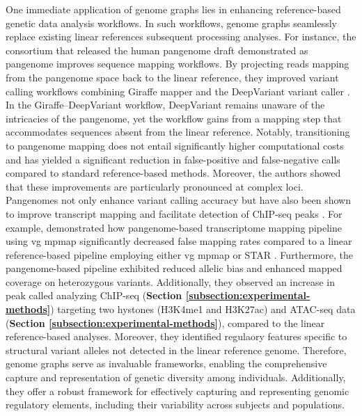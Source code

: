 \documentclass[a4paper, titlepage, openright]{book}
\begin{document}
One immediate application of genome graphs lies in enhancing reference-based genetic data analysis workflows. In such workflows, genome graphs seamlessly replace existing linear references subsequent processing analyses. For instance, the consortium that released the human pangenome draft demonstrated as pangenome improves sequence mapping workflows. By projecting reads mapping from the pangenome space back to the linear reference, they improved variant calling workflows combining Giraffe mapper \citep{siren2021pangenomics} and the DeepVariant variant caller \citep{poplin2018universal}. In the Giraffe–DeepVariant workflow, DeepVariant remains unaware of the intricacies of the pangenome, yet the workflow gains from a mapping step that accommodates sequences absent from the linear reference. Notably, transitioning to pangenome mapping does not entail significantly higher computational costs and has yielded a significant reduction in false-positive and false-negative calls compared to standard reference-based methods. Moreover, the authors showed that these improvements are particularly pronounced at complex loci. Pangenomes not only enhance variant calling accuracy but have also been shown to improve transcript mapping \citep{sibbesen2023haplotype} and facilitate detection of ChIP-seq peaks \citep{groza2020personalized}. For example, \cite{liao2023draft} demonstrated how pangenome-based transcriptome mapping pipeline using vg mpmap \citep{sibbesen2023haplotype} significantly decreased false mapping rates compared to a linear reference-based pipeline employing either vg mpmap or STAR \citep{dobin2013star}. Furthermore, the pangenome-based pipeline exhibited reduced allelic bias and enhanced mapped coverage on heterozygous variants. Additionally, they observed an increase in peak called analyzing ChIP-seq (\textbf{Section \ref{subsection:experimental-methods}}) targeting two hystones (H3K4me1 and H3K27ac) and ATAC-seq data (\textbf{Section \ref{subsection:experimental-methods}}), compared to the linear reference-based analyses. Moreover, they identified regulaory features specific to structural variant alleles not detected in the linear reference genome. Therefore, genome graphs serve as invaluable frameworks, enabling the comprehensive capture and representation of genetic diversity among individuals. Additionally, they offer a robust framework for effectively capturing and representing genomic regulatory elements, including their variability across subjects and populations.
\end{document}
